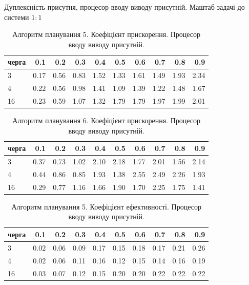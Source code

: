     Дуплексність присутня, процесор вводу виводу присутній. Маштаб задачі до системи $1:1$


\begin{table}[H]
\caption{Алгоритм планування 5. Коефіцієнт прискорення. Процесор вводу виводу присутній.}
\label{tab:big_table}
\centering
\begin{tabular}{lrrrrrrrrr}
\toprule
черга &   0.1 &   0.2 &   0.3 &   0.4 &   0.5 &   0.6 &   0.7 &   0.8 &   0.9 \\
\midrule
3 & 0.17 & 0.56 & 0.83 & 1.52 & 1.33 & 1.61 & 1.49 & 1.93 & 2.34 \\
4 & 0.22 & 0.56 & 0.98 & 1.41 & 1.09 & 1.39 & 1.22 & 1.48 & 1.67 \\
16 & 0.23 & 0.59 & 1.07 & 1.32 & 1.79 & 1.79 & 1.97 & 1.99 & 2.01 \\
\bottomrule
\end{tabular}
\end{table}

\begin{table}[H]
\caption{Алгоритм планування 6. Коефіцієнт прискорення. Процесор вводу виводу присутній.}
\label{tab:big_table}
\centering
\begin{tabular}{lrrrrrrrrr}
\toprule
черга &   0.1 &   0.2 &   0.3 &   0.4 &   0.5 &   0.6 &   0.7 &   0.8 &   0.9 \\
\midrule
3 & 0.37 & 0.73 & 1.02 & 2.10 & 2.18 & 1.77 & 2.01 & 1.56 & 2.14 \\
4 & 0.44 & 0.86 & 0.85 & 1.93 & 1.38 & 2.55 & 2.49 & 2.26 & 1.93 \\
16 & 0.29 & 0.77 & 1.16 & 1.66 & 1.90 & 1.70 & 2.25 & 1.75 & 1.41 \\
\bottomrule
\end{tabular}
\end{table}

\begin{table}[H]
\caption{Алгоритм планування 5. Коефіцієнт ефективності. Процесор вводу виводу присутній.}
\label{tab:big_table}
\centering
\begin{tabular}{lrrrrrrrrr}
\toprule
черга &   0.1 &   0.2 &   0.3 &   0.4 &   0.5 &   0.6 &   0.7 &   0.8 &   0.9 \\
\midrule
3 & 0.02 & 0.06 & 0.09 & 0.17 & 0.15 & 0.18 & 0.17 & 0.21 & 0.26 \\
4 & 0.02 & 0.06 & 0.11 & 0.16 & 0.12 & 0.15 & 0.14 & 0.16 & 0.19 \\
16 & 0.03 & 0.07 & 0.12 & 0.15 & 0.20 & 0.20 & 0.22 & 0.22 & 0.22 \\
\bottomrule
\end{tabular}
\end{table}

